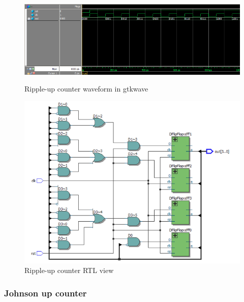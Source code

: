 \documentclass{article}
\begin{document}
\begin{figure}
  \centering
  \includegraphics[width=\linewidth]{figures/waveforms/synUp_wave.png}
  \caption{Ripple-up counter waveform in gtkwave}
  \label{fig:synUp_waveform}

  \includegraphics[width=0.75\linewidth]{figures/RTLs/synUp_RTL.png}
  \caption{Ripple-up counter RTL view}
  \label{fig:synUp_RTL}
\end{figure}
\newpage

\subsubsection{Johnson up counter}


\newpage
\end{document}
